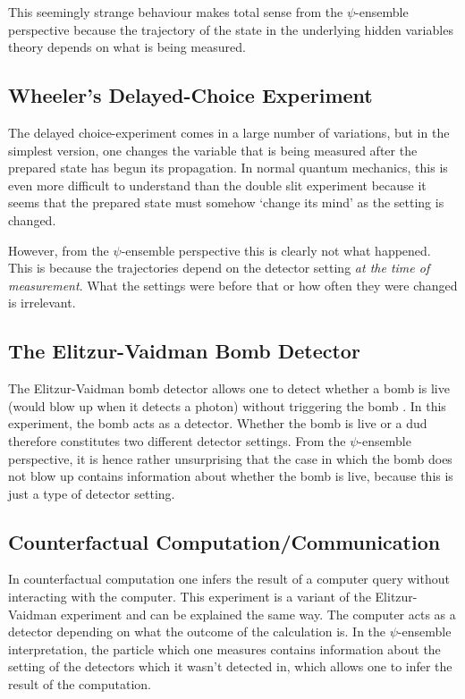 \documentclass[superscriptaddress,twocolumn,floatfix,nofootinbib]{revtex4-2}
\begin{document}
This seemingly strange behaviour makes total sense from the $\psi$-ensemble perspective because the trajectory of the state in the underlying hidden variables theory depends on what is being measured. 

\subsection{Wheeler's Delayed-Choice Experiment}

The delayed choice-experiment \cite{Wheeler1978Delayed} comes in a large number of variations, but in the simplest version, one changes the variable that is being measured after the prepared state has begun its propagation. In normal quantum mechanics, this is even more difficult to understand than the double slit experiment because it seems that the prepared state must somehow `change its mind' as the setting is changed. 

However, from the $\psi$-ensemble perspective this is clearly not what happened. This is because the trajectories depend on the detector setting \emph{at the time of measurement}. What the settings were before that or how often they were changed is irrelevant.

\subsection{The Elitzur-Vaidman Bomb Detector}

The Elitzur-Vaidman bomb detector allows one to detect whether a bomb is live (would blow up when it detects a photon) without triggering the bomb \cite{Elitzur1993Bomb}. In this experiment, the bomb acts as a detector. Whether the bomb is live or a dud therefore constitutes two different detector settings. From the $\psi$-ensemble perspective, it is hence rather unsurprising that the case in which the bomb does not blow up contains information about whether the bomb is live, because this is just a type of detector setting.

\subsection{Counterfactual Computation/Communication}

In counterfactual computation \cite{Hosten2006CFComp} one infers the result of a computer query without interacting with the computer. This experiment is a variant of the Elitzur-Vaidman experiment and can be explained the same way. The computer acts as a detector depending on what the outcome of the calculation is. In the $\psi$-ensemble interpretation, the particle which one measures contains information about the setting of the detectors which it wasn't detected in, which allows one to infer the result of the computation.
\end{document}

